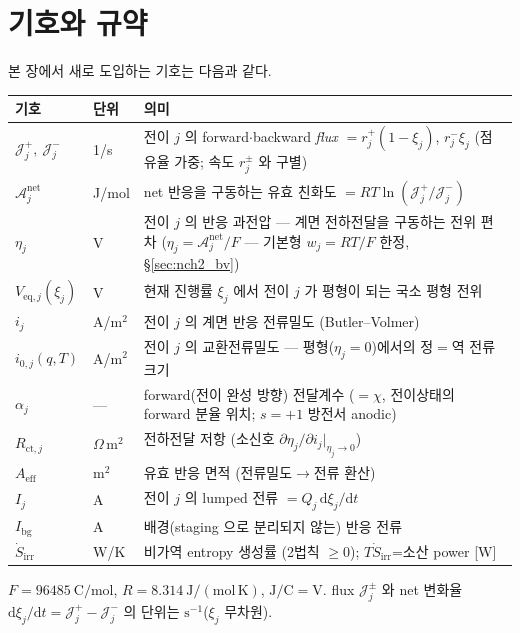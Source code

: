 \documentclass[11pt,a4paper]{article}
\newcommand{\dd}{\mathrm{d}}
\newcommand{\eff}{\mathrm{eff}}
\newcommand{\eq}{\mathrm{eq}}
\newcommand{\bg}{\mathrm{bg}}
\newcommand{\ct}{\mathrm{ct}}
\newcommand{\irr}{\mathrm{irr}}
\begin{document}
\section{기호와 규약}\label{sec:nch2_notation}
본 장에서 새로 도입하는 기호는 다음과 같다.
\begin{longtable}{p{} p{} >{\raggedright\arraybackslash}p{}}
\toprule 기호 & 단위 & 의미 \\ \midrule \endhead
$\mathcal J_j^+,\ \mathcal J_j^-$ & 1/s & 전이 $j$ 의 forward$\cdot$backward \emph{flux} $=r_j^+(1-\xi_j)$, $r_j^-\xi_j$ (점유율 가중; 속도 $r_j^\pm$ 와 구별) \\
$\mathcal A_j^{\mathrm{net}}$ & J/mol & net 반응을 구동하는 유효 친화도 $=RT\ln(\mathcal J_j^+/\mathcal J_j^-)$ \\
$\eta_j$ & V & 전이 $j$ 의 반응 과전압 — 계면 전하전달을 구동하는 전위 편차 ($\eta_j=\mathcal A_j^{\mathrm{net}}/F$ — 기본형 $w_j=RT/F$ 한정, \S\ref{sec:nch2_bv}) \\
$V_{\eq,j}(\xi_j)$ & V & 현재 진행률 $\xi_j$ 에서 전이 $j$ 가 평형이 되는 국소 평형 전위 \\
$i_j$ & A/m$^2$ & 전이 $j$ 의 계면 반응 전류밀도 (Butler--Volmer) \\
$i_{0,j}(q,T)$ & A/m$^2$ & 전이 $j$ 의 교환전류밀도 — 평형($\eta_j=0$)에서의 정$=$역 전류 크기 \\
$\alpha_j$ & --- & forward(전이 완성 방향) 전달계수 ($=\chi$, 전이상태의 forward 분율 위치; $s=+1$ 방전서 anodic) \\
$R_{\ct,j}$ & $\Omega\,\mathrm{m^2}$ & 전하전달 저항 (소신호 $\partial\eta_j/\partial i_j|_{\eta_j\to0}$) \\
$A_\eff$ & m$^2$ & 유효 반응 면적 (전류밀도$\to$전류 환산) \\
$I_j$ & A & 전이 $j$ 의 lumped 전류 $=Q_j\,\dd\xi_j/\dd t$ \\
$I_\bg$ & A & 배경(staging 으로 분리되지 않는) 반응 전류 \\
$\dot S_{\irr}$ & W/K & 비가역 entropy 생성률 (2법칙 $\ge0$); $T\dot S_\irr$=소산 power [W] \\
\bottomrule
\end{longtable}
$F=96485\ \mathrm{C/mol}$, $R=8.314\ \mathrm{J/(mol\,K)}$, $\mathrm{J/C}=\mathrm V$. flux $\mathcal J_j^\pm$ 와
net 변화율 $\dd\xi_j/\dd t=\mathcal J_j^+-\mathcal J_j^-$ 의 단위는 $\mathrm{s^{-1}}$($\xi_j$ 무차원).
\end{document}
